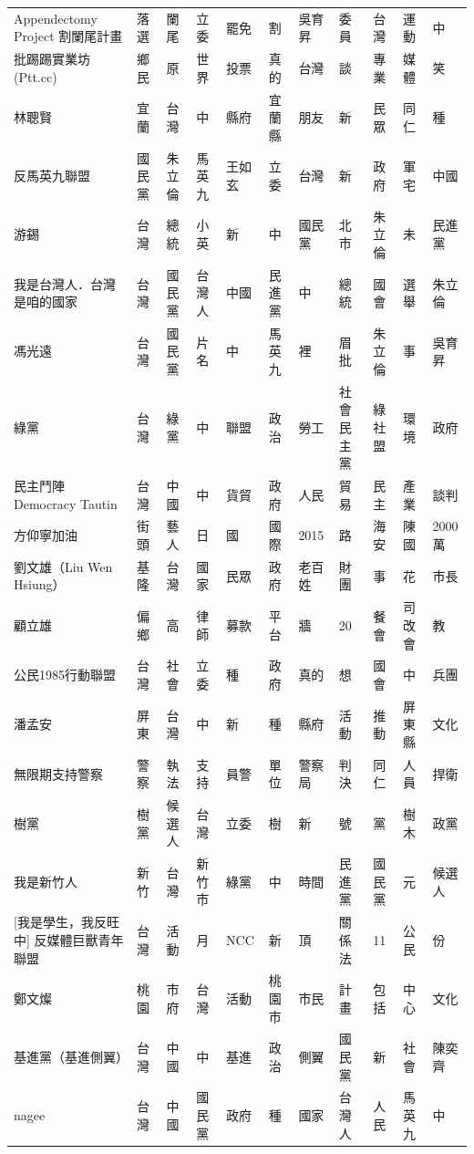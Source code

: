 \documentclass[a4paper, 10pt, conference]{ieeeconf}       %
\begin{document}
\begin{CJK}{UTF8}{bsmi}
\begin{longtable}[c]{@{}L{2.45cm}L{1.1cm}L{1.1cm}L{1.1cm}L{1.1cm}L{1.1cm}L{1.1cm}L{1.1cm}L{1.41cm}L{1.1cm}L{1.1cm}@{}}
Appendectomy Project 割闌尾計畫 & 落選 & 闌尾 & 立委 & 罷免 & 割 & 吳育昇 & 委員 & 台灣 & 運動 & 中 \\
批踢踢實業坊(Ptt.cc) & 鄉民 & 原 & 世界 & 投票 & 真的 & 台灣 & 談 & 專業 & 媒體 & 笑 \\
林聰賢 & 宜蘭 & 台灣 & 中 & 縣府 & 宜蘭縣 & 朋友 & 新 & 民眾 & 同仁 & 種 \\
反馬英九聯盟 & 國民黨 & 朱立倫 & 馬英九 & 王如玄 & 立委 & 台灣 & 新 & 政府 & 軍宅 & 中國 \\
游錫\charkun{} & 台灣 & 總統 & 小英 & 新 & 中 & 國民黨 & 北市 & 朱立倫 & 未 & 民進黨 \\
我是台灣人．台灣是咱的國家 & 台灣 & 國民黨 & 台灣人 & 中國 & 民進黨 & 中 & 總統 & 國會 & 選舉 & 朱立倫 \\
馮光遠 & 台灣 & 國民黨 & 片名 & 中 & 馬英九 & 裡 & 眉批 & 朱立倫 & 事 & 吳育昇 \\
綠黨 & 台灣 & 綠黨 & 中 & 聯盟 & 政治 & 勞工 & 社會民主黨 & 綠社盟 & 環境 & 政府 \\
民主鬥陣 Democracy Tautin & 台灣 & 中國 & 中 & 貨貿 & 政府 & 人民 & 貿易 & 民主 & 產業 & 談判 \\
方仰寧加油 & 街頭 & 藝人 & 日 & 國 & 國際 & 2015 & 路 & 海安 & 陳國 & 2000萬 \\
劉文雄（Liu Wen Hsiung） & 基隆 & 台灣 & 國家 & 民眾 & 政府 & 老百姓 & 財團 & 事 & 花 & 市長 \\
顧立雄 & 偏鄉 & 高 & 律師 & 募款 & 平台 & 牆 & 20 & 餐會 & 司改會 & 教 \\
公民1985行動聯盟 & 台灣 & 社會 & 立委 & 種 & 政府 & 真的 & 想 & 國會 & 中 & 兵團 \\
潘孟安 & 屏東 & 台灣 & 中 & 新 & 種 & 縣府 & 活動 & 推動 & 屏東縣 & 文化 \\
無限期支持警察 & 警察 & 執法 & 支持 & 員警 & 單位 & 警察局 & 判決 & 同仁 & 人員 & 捍衛 \\
樹黨 & 樹黨 & 候選人 & 台灣 & 立委 & 樹 & 新 & 號 & 黨 & 樹木 & 政黨 \\
我是新竹人 & 新竹 & 台灣 & 新竹市 & 綠黨 & 中 & 時間 & 民進黨 & 國民黨 & 元 & 候選人 \\
{[}我是學生，我反旺中{]} 反媒體巨獸青年聯盟 & 台灣 & 活動 & 月 & NCC & 新 & 頂 & 關係法 & 11 & 公民 & 份 \\
鄭文燦 & 桃園 & 市府 & 台灣 & 活動 & 桃園市 & 市民 & 計畫 & 包括 & 中心 & 文化 \\
基進黨（基進側翼） & 台灣 & 中國 & 中 & 基進 & 政治 & 側翼 & 國民黨 & 新 & 社會 & 陳奕齊 \\
nagee & 台灣 & 中國 & 國民黨 & 政府 & 種 & 國家 & 台灣人 & 人民 & 馬英九 & 中 \\

\end{longtable}
\end{CJK}
\end{document}
